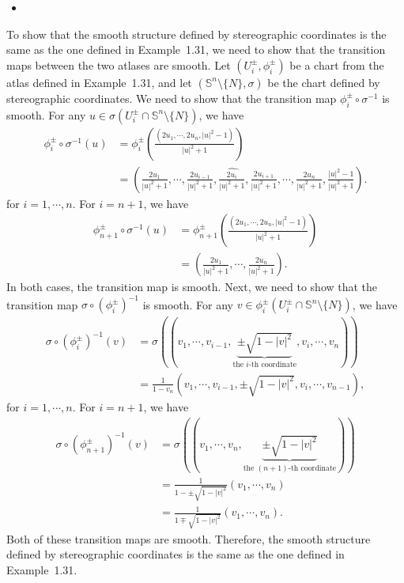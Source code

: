 \begin{itemize}
    \item [(d)]
\end{itemize}
To show that the smooth structure defined by stereographic coordinates is the same as the one defined in Example~1.31, we need to show that the transition maps between the two atlases are smooth.
Let $(U_i^\pm,\phi_i^\pm)$ be a chart from the atlas defined in Example~1.31, and let $(\mathbb{S}^n\setminus \{N\},\sigma)$ be the chart defined by stereographic coordinates. We need to show that the transition map $\phi_i^\pm\circ \sigma^{-1}$ is smooth. For any $u\in \sigma(U_i^\pm \cap \mathbb{S}^n\setminus \{N\})$, we have 
\begin{align}
    \phi_i^\pm\circ \sigma^{-1}(u)&=\phi_i^\pm\left(\frac{(2u_1,\cdots,2u_n, |u|^2-1)}{|u|^2+1}\right)\\
    &=\left(\frac{2u_1}{|u|^2+1},\cdots,\frac{2u_{i-1}}{|u|^2+1}, \hat{\frac{2u_i}{|u|^2+1}}, \frac{2u_{i+1}}{|u|^2+1}, \cdots, \frac{2u_n}{|u|^2+1},\frac{|u|^2-1}{|u|^2+1}\right).
\end{align}
for $i=1,\cdots,n$. For $i=n+1$, we have
\begin{align}
    \phi_{n+1}^\pm\circ \sigma^{-1}(u)&=\phi_{n+1}^\pm\left(\frac{(2u_1,\cdots,2u_n, |u|^2-1)}{|u|^2+1}\right)\\
    &=\left(\frac{2u_1}{|u|^2+1},\cdots,\frac{2u_n}{|u|^2+1}\right).
\end{align}
In both cases, the transition map is smooth. Next, we need to show that the transition map $\sigma\circ (\phi_i^\pm)^{-1}$ is smooth. For any $v\in \phi_i^\pm(U_i^\pm \cap \mathbb{S}^n\setminus \{N\})$, we have
\begin{align}
    \sigma\circ (\phi_i^\pm)^{-1}(v)&=\sigma\left((v_1,\cdots,v_{i-1},\underbrace{\pm\sqrt{1-|v|^2}}_{\text{the $i$-th coordinate}},v_i,\cdots,v_n)\right)\\
    &=\frac{1}{1-v_n}\left(v_1,\cdots,v_{i-1},\pm\sqrt{1-|v|^2},v_i,\cdots,v_{n-1}\right),
\end{align}
for $i=1,\cdots,n$. For $i=n+1$, we have
\begin{align}
    \sigma\circ (\phi_{n+1}^\pm)^{-1}(v)&=\sigma\left((v_1,\cdots,v_n,\underbrace{\pm\sqrt{1-|v|^2}}_{\text{the $(n+1)$-th coordinate}})\right)\\
    &=\frac{1}{1-\pm\sqrt{1-|v|^2}}\left(v_1,\cdots,v_n\right)\\
    &=\frac{1}{1\mp\sqrt{1-|v|^2}}\left(v_1,\cdots,v_n\right).
\end{align}
Both of these transition maps are smooth. Therefore, the smooth structure defined by stereographic coordinates is the same as the one defined in Example~1.31.





